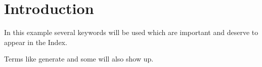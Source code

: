 \documentclass{article}
\begin{document}
 
\section{Introduction}
In this example several keywords will be used 
which are important and deserve to appear in the Index.
 
Terms like generate and some will 
also show up. 
 
\printindex
 
\end{document}
